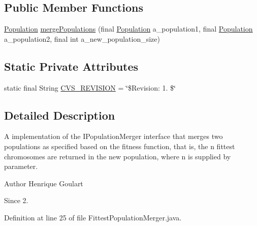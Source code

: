 \subsection*{Public Member Functions}
\begin{DoxyCompactItemize}
\item 
\hyperlink{classorg_1_1jgap_1_1_population}{Population} \hyperlink{classorg_1_1jgap_1_1impl_1_1_fittest_population_merger_ae0bd6e67df9b565c419733478078e384}{merge\-Populations} (final \hyperlink{classorg_1_1jgap_1_1_population}{Population} a\-\_\-population1, final \hyperlink{classorg_1_1jgap_1_1_population}{Population} a\-\_\-population2, final int a\-\_\-new\-\_\-population\-\_\-size)
\end{DoxyCompactItemize}
\subsection*{Static Private Attributes}
\begin{DoxyCompactItemize}
\item 
static final String \hyperlink{classorg_1_1jgap_1_1impl_1_1_fittest_population_merger_a95733340fb668bfd83f3c45e6a571ef6}{C\-V\-S\-\_\-\-R\-E\-V\-I\-S\-I\-O\-N} = \char`\"{}\$Revision\-: 1. \$\char`\"{}
\end{DoxyCompactItemize}


\subsection{Detailed Description}
A implementation of the I\-Population\-Merger interface that merges two populations as specified based on the fitness function, that is, the n fittest chromosomes are returned in the new population, where n is supplied by parameter.

\begin{DoxyAuthor}{Author}
Henrique Goulart 
\end{DoxyAuthor}
\begin{DoxySince}{Since}
2. 
\end{DoxySince}


Definition at line 25 of file Fittest\-Population\-Merger.\-java.



